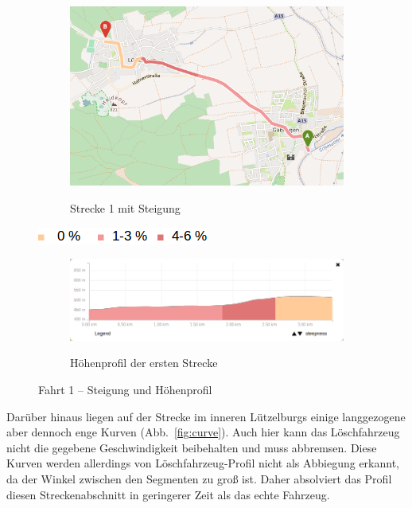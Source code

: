 \begin{figure}[htb]
\centering
\begin{subfigure}{0.80\textwidth}
\centering
\includegraphics[width = \textwidth]{../media/Fahrt1_Steep.png} \\
\caption{Strecke 1 mit Steigung}
\label{fig:steig}
\end{subfigure}

\includegraphics[width =0.25 \textwidth]{../media/legend2.png} \\

\begin{subfigure}{ \textwidth}
\centering
\includegraphics[width = \textwidth]{../media/Fahrt1_Profile.png} \\
\caption{Höhenprofil der ersten Strecke}
\label{profile}
\end{subfigure}
\caption{Fahrt 1 -- Steigung und Höhenprofil}
\label{steig}
\end{figure}

Darüber hinaus liegen auf der Strecke im inneren Lützelburgs einige langgezogene aber dennoch enge Kurven (Abb.~\ref{fig:curve}).
Auch hier kann das Löschfahrzeug nicht die gegebene Geschwindigkeit beibehalten und muss abbremsen.
Diese Kurven werden allerdings von Löschfahrzeug-Profil nicht als Abbiegung erkannt, da der Winkel zwischen den Segmenten zu groß ist.
Daher absolviert das Profil diesen Streckenabschnitt in geringerer Zeit als das echte Fahrzeug.

